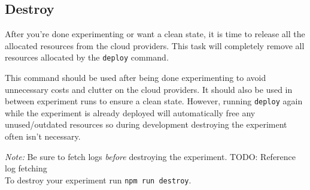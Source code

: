 \documentclass[../main.tex]{subfiles}
\begin{document}
\subsection{Destroy}\label{sec:destroy}
After you're done experimenting or want a clean state, it is time to release all the allocated resources from the cloud providers.
This task will completely remove all resources allocated by the \texttt{deploy} command. 

This command should be used after being done experimenting to avoid unnecessary costs and clutter on the cloud providers.
It should also be used in between experiment runs to ensure a clean state.
However, running \texttt{deploy} again while the experiment is already deployed will automatically free any unused/outdated resources so during development destroying the experiment often isn't necessary.

\textit{Note:} Be sure to fetch logs \textit{before} destroying the experiment. TODO: Reference log fetching\\
To destroy your experiment run \texttt{npm run destroy}.\\
\end{document}

